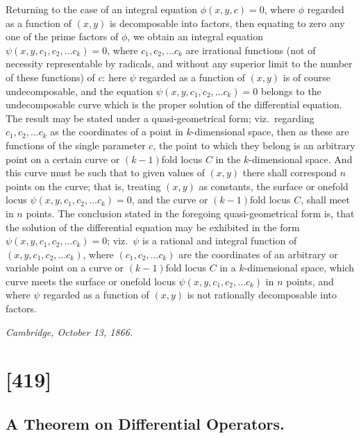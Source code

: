 \documentclass[11pt,a4paper]{article}
\begin{document}
Returning to the case of an integral equation $\phi(x, y, c) = 0$, where
$\phi$ regarded as a function of $(x, y)$ is decomposable into factors, then
equating to zero any one of the prime factors of $\phi$, we obtain an integral
equation $\psi(x, y, c_1, c_2, \ldots c_k) = 0$, where $c_1, c_2, \ldots c_k$ are
irrational functions (not of necessity representable by radicals, and without
any superior limit to the number of these functions) of $c$: here $\psi$
regarded as a function of $(x, y)$ is of course undecomposable, and the
equation $\psi(x, y, c_1, c_2, \ldots c_k) = 0$ belongs to the undecomposable
curve which is the proper solution of the differential equation.  The result
may be stated under a quasi-geometrical form; viz.\ regarding
$c_1, c_2, \ldots c_k$ as the coordinates of a point in $k$-dimensional space,
then as these are functions of the single parameter $c$, the point to which
they belong is an arbitrary point on a certain curve or $(k-1)$fold locus $C$
in the $k$-dimensional space.  And this curve must be such that to given values
of $(x, y)$ there shall correspond $n$ points on the curve; that is, treating
$(x, y)$ as constants, the surface or onefold locus
$\psi(x, y, c_1, c_2, \ldots c_k) = 0$, and the curve or $(k-1)$fold locus $C$,
shall meet in $n$ points.  The conclusion stated in the foregoing
quasi-geometrical form is, that the solution of the differential equation may
be exhibited in the form $\psi(x, y, c_1, c_2, \ldots c_k) = 0$; viz.\ $\psi$
is a rational and integral function of $(x, y, c_1, c_2, \ldots c_k)$, where
$(c_1, c_2, \ldots c_k)$ are the coordinates of an arbitrary or variable point
on a curve or $(k-1)$fold locus $C$ in a $k$-dimensional space, which curve
meets the surface or onefold locus $\psi(x, y, c_1, c_2, \ldots c_k)$ in $n$
points, and where $\psi$ regarded as a function of $(x, y)$ is not rationally
decomposable into factors.

\begin{flushright}
\textit{Cambridge, October 13, 1866.}
\end{flushright}

\clearpage

\section*{[419]}
\subsection*{A Theorem on Differential Operators.}
\end{document}
